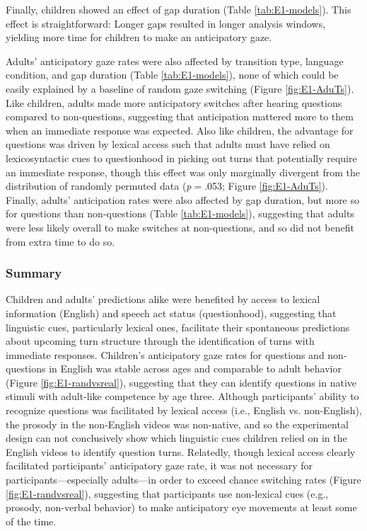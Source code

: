 \documentclass[authoryear, 12pt]{elsarticle}
\begin{document}
Finally, children showed an effect of gap duration (Table \ref{tab:E1-models}). This effect is straightforward: Longer gaps resulted in longer analysis windows, yielding more time for children to make an anticipatory gaze.

Adults' anticipatory gaze rates were also affected by transition type, language condition, and gap duration (Table \ref{tab:E1-models}), none of which could be easily explained by a baseline of random gaze switching (Figure \ref{fig:E1-AduTs}). Like children, adults made more anticipatory switches after hearing questions compared to non-questions, suggesting that anticipation mattered more to them when an immediate response was expected. Also like children, the advantage for questions was driven by lexical access such that adults must have relied on lexicosyntactic cues to questionhood in picking out turns that potentially require an immediate response, though this effect was only marginally divergent from the distribution of randomly permuted data (\textit{p}$=$.053; Figure \ref{fig:E1-AduTs}). Finally, adults' anticipation rates were also affected by gap duration, but more so for questions than non-questions (Table \ref{tab:E1-models}), suggesting that adults were less likely overall to make switches at non-questions, and so did not benefit from extra time to do so.

\subsubsection{Summary}
\label{sec:summary1}

Children and adults' predictions alike were benefited by access to lexical information (English) and speech act status (questionhood), suggesting that linguistic cues, particularly lexical ones, facilitate their spontaneous predictions about upcoming turn structure through the identification of turns with immediate responses. Children's anticipatory gaze rates for questions and non-questions in English was stable across ages and comparable to adult behavior (Figure \ref{fig:E1-randvsreal}), suggesting that they can identify questions in native stimuli with adult-like competence by age three. Although participants' ability to recognize questions was facilitated by lexical access (i.e., English vs. non-English), the prosody in the non-English videos was non-native, and so the experimental design can not conclusively show which linguistic cues children relied on in the English videos to identify question turns. Relatedly, though lexical access clearly facilitated participants' anticipatory gaze rate, it was not necessary for participants---especially adults---in order to exceed chance switching rates (Figure \ref{fig:E1-randvsreal}), suggesting that participants use non-lexical cues (e.g., prosody, non-verbal behavior) to make anticipatory eye movements at least some of the time.
\end{document}
